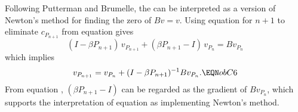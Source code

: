 Following Putterman and Brumelle, the  can
be interpreted as a version of Newton's method for finding the zero of $Bv=v$.
Using equation
  for $n+1$ to eliminate $c_{P_{n+1}}$ from equation  gives
$$(I-\beta P_{n+1})\, v_{P_{n+1}} + (\beta P_{n+1}-I)\, v_{P_n} = Bv_{P_n}$$
which implies
$$v_{P_{n+1}} = v_{P_n} + (I-\beta P_{n+1})^{-1} B v_{P_n} .\EQN obC6$$
From equation , $(\beta P_{n+1} - I)$ can be regarded as the
gradient of
$B v_{P_n}$, which supports the interpretation of equation
  as implementing
Newton's method.

%
